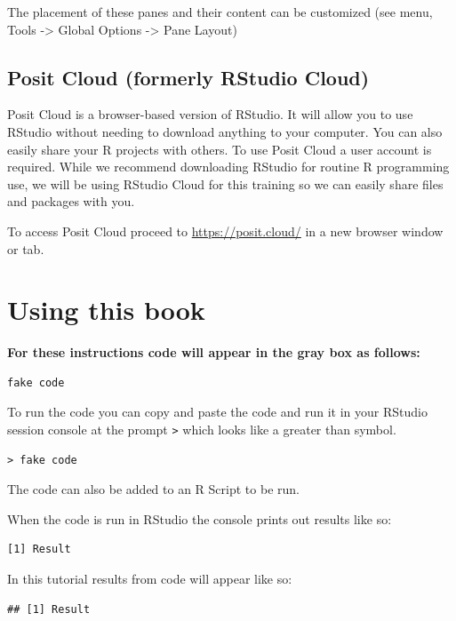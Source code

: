 \documentclass[
  letterpaper,
  DIV=11,
  numbers=noendperiod]{scrreprt}
\begin{document}
The placement of these panes and their content can be customized (see
menu, Tools -\textgreater{} Global Options -\textgreater{} Pane Layout)

\hypertarget{posit-cloud-formerly-rstudio-cloud}{%
\subsection{Posit Cloud (formerly RStudio
Cloud)}\label{posit-cloud-formerly-rstudio-cloud}}

Posit Cloud is a browser-based version of RStudio. It will allow you to
use RStudio without needing to download anything to your computer. You
can also easily share your R projects with others. To use Posit Cloud a
user account is required. While we recommend downloading RStudio for
routine R programming use, we will be using RStudio Cloud for this
training so we can easily share files and packages with you.

To access Posit Cloud proceed to \url{https://posit.cloud/} in a new
browser window or tab.

\hypertarget{using-this-book}{%
\section{Using this book}\label{using-this-book}}

\textbf{For these instructions code will appear in the gray box as
follows:}

\begin{verbatim}
fake code
\end{verbatim}

To run the code you can copy and paste the code and run it in your
RStudio session console at the prompt \texttt{\textgreater{}} which
looks like a greater than symbol.

\begin{verbatim}
> fake code
\end{verbatim}

The code can also be added to an R Script to be run.

When the code is run in RStudio the console prints out results like so:

\begin{verbatim}
[1] Result
\end{verbatim}

In this tutorial results from code will appear like so:

\begin{verbatim}
## [1] Result
\end{verbatim}
\end{document}
